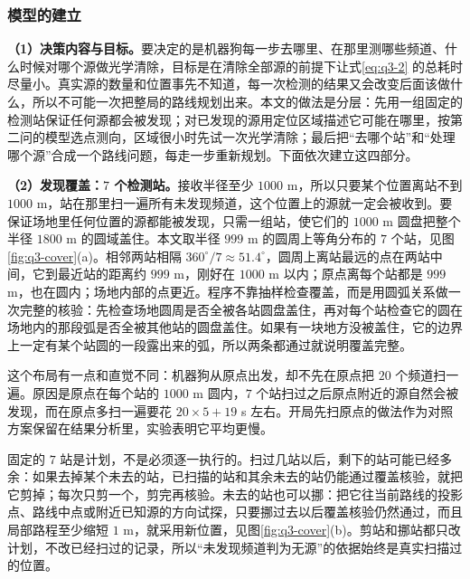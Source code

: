 \subsubsection{模型的建立}\label{sec:q3-2}

\textbf{（1）决策内容与目标。}要决定的是机器狗每一步去哪里、在那里测哪些频道、什么时候对哪个源做光学清除，目标是在清除全部源的前提下让式\eqref{eq:q3-2} 的总耗时尽量小。真实源的数量和位置事先不知道，每一次检测的结果又会改变后面该做什么，所以不可能一次把整局的路线规划出来。本文的做法是分层：先用一组固定的检测站保证任何源都会被发现；对已发现的源用定位区域描述它可能在哪里，按第二问的模型选点测向，区域很小时先试一次光学清除；最后把“去哪个站”和“处理哪个源”合成一个路线问题，每走一步重新规划。下面依次建立这四部分。

\textbf{（2）发现覆盖：$7$ 个检测站。}接收半径至少 $1000$ m，所以只要某个位置离站不到 $1000$ m，站在那里扫一遍所有未发现频道，这个位置上的源就一定会被收到。要保证场地里任何位置的源都能被发现，只需一组站，使它们的 $1000$ m 圆盘把整个半径 $1800$ m 的圆域盖住。本文取半径 $999$ m 的圆周上等角分布的 $7$ 个站，见图\ref{fig:q3-cover}(a)。相邻两站相隔 $360^\circ/7\approx51.4^\circ$，圆周上离站最远的点在两站中间，它到最近站的距离约 $999$ m，刚好在 $1000$ m 以内；原点离每个站都是 $999$ m，也在圆内；场地内部的点更近。程序不靠抽样检查覆盖，而是用圆弧关系做一次完整的核验：先检查场地圆周是否全被各站圆盘盖住，再对每个站检查它的圆在场地内的那段弧是否全被其他站的圆盘盖住。如果有一块地方没被盖住，它的边界上一定有某个站圆的一段露出来的弧，所以两条都通过就说明覆盖完整。

这个布局有一点和直觉不同：机器狗从原点出发，却不先在原点把 $20$ 个频道扫一遍。原因是原点在每个站的 $1000$ m 圆内，$7$ 个站扫过之后原点附近的源自然会被发现，而在原点多扫一遍要花 $20\times5+19$ s 左右。开局先扫原点的做法作为对照方案保留在结果分析里，实验表明它平均更慢。

固定的 $7$ 站是计划，不是必须逐一执行的。扫过几站以后，剩下的站可能已经多余：如果去掉某个未去的站，已扫描的站和其余未去的站仍能通过覆盖核验，就把它剪掉；每次只剪一个，剪完再核验。未去的站也可以挪：把它往当前路线的投影点、路线中点或附近已知源的方向试探，只要挪过去以后覆盖核验仍然通过，而且局部路程至少缩短 $1$ m，就采用新位置，见图\ref{fig:q3-cover}(b)。剪站和挪站都只改计划，不改已经扫过的记录，所以“未发现频道判为无源”的依据始终是真实扫描过的位置。

\begin{center}
\begin{minipage}{\linewidth}
\centering
\QThreeCoverFigure
{}
\label{fig:q3-cover}
\end{minipage}
\end{center}

